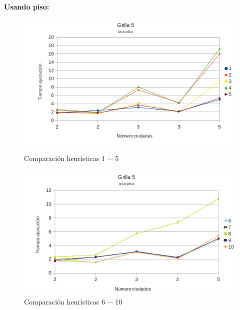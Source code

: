 \documentclass[a4paper,10pt]{article}
\begin{document}
\newpage

\textbf{Usando piso:}

\begin{figure}[ht]

\begin{minipage}[b]{0.45\linewidth}
 \centering
 \includegraphics[width=\textwidth]{grilla5floor0.png}
 \caption{Comparación heurísticas  1 $\cdots$ 5}
 \label{fig:grid5floor0}
\end{minipage}
\hspace{0.5cm}
\begin{minipage}[b]{0.45\linewidth}
 \centering
 \includegraphics[width=\textwidth]{grilla5floor1.png}
 \caption{Comparación heurísticas  6 $\cdots$ 10}
 \label{fig:grid5floor1}
\end{minipage}


\end{figure}
\end{document}
